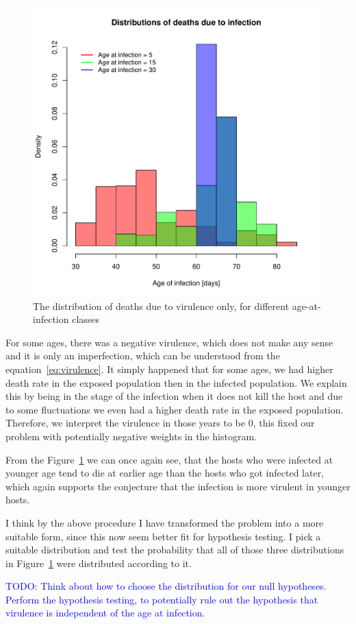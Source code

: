 \documentclass[10pt]{article}         %
\begin{document}
\begin{figure}[ht!]
    \includegraphics[width=\textwidth]{Distribution_of_deaths_due_to_virulence.pdf}
    \caption{The distribution of deaths due to virulence only, for different age-at-infection classes}
\label{fig:deaths_due_virulence_distributions}
\end{figure}
\newpage
For some ages, there was a negative virulence, which does not make any sense and it is only an imperfection, which can be understood from the equation~\ref{eq:virulence}. It simply happened that for some ages, we had higher death rate in the exposed population then in the infected population. We explain this by being in the stage of the infection when it does not kill the host and due to some fluctuations we even had a higher death rate in the exposed population. Therefore, we interpret the virulence in those years to be 0, this fixed our problem with potentially negative weights in the histogram.

From the Figure~\ref{fig:deaths_due_virulence_distributions} we can once again see, that the hosts who were infected at younger age tend to die at earlier age than the hosts who got infected later, which again supports the conjecture that the infection is more virulent in younger hosts.

I think by the above procedure I have transformed the problem into a more suitable form, since this now seem better fit for hypothesis testing. I pick a suitable distribution and test the probability that all of those three distributions in Figure~\ref{fig:deaths_due_virulence_distributions} were distributed according to it.

\textcolor{blue}{TODO: Think about how to choose the distribution for our null hypotheses. Perform the hypothesis testing, to potentially rule out the hypothesis that virulence is independent of the age at infection.}




\end{document}
